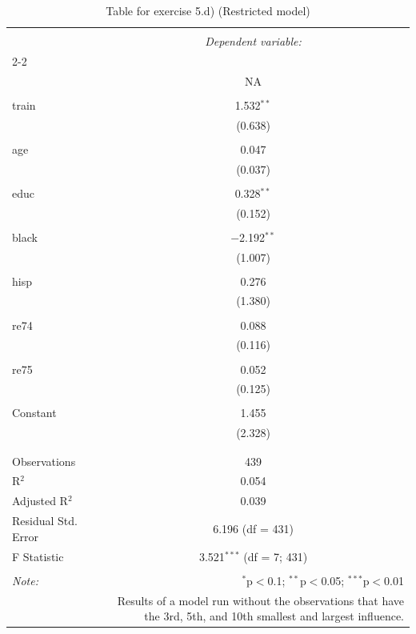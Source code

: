 
\begin{table}[!htbp] \centering 
  \caption{Table for exercise 5.d) (Restricted model)} 
  \label{} 
\begin{tabular}{@{\extracolsep{5pt}}lc} 
\\[-1.8ex]\hline 
\hline \\[-1.8ex] 
 & \multicolumn{1}{c}{\textit{Dependent variable:}} \\ 
\cline{2-2} 
\\[-1.8ex] & NA \\ 
\hline \\[-1.8ex] 
 train & 1.532$^{**}$ \\ 
  & (0.638) \\ 
  & \\ 
 age & 0.047 \\ 
  & (0.037) \\ 
  & \\ 
 educ & 0.328$^{**}$ \\ 
  & (0.152) \\ 
  & \\ 
 black & $-$2.192$^{**}$ \\ 
  & (1.007) \\ 
  & \\ 
 hisp & 0.276 \\ 
  & (1.380) \\ 
  & \\ 
 re74 & 0.088 \\ 
  & (0.116) \\ 
  & \\ 
 re75 & 0.052 \\ 
  & (0.125) \\ 
  & \\ 
 Constant & 1.455 \\ 
  & (2.328) \\ 
  & \\ 
\hline \\[-1.8ex] 
Observations & 439 \\ 
R$^{2}$ & 0.054 \\ 
Adjusted R$^{2}$ & 0.039 \\ 
Residual Std. Error & 6.196 (df = 431) \\ 
F Statistic & 3.521$^{***}$ (df = 7; 431) \\ 
\hline 
\hline \\[-1.8ex] 
\textit{Note:}  & \multicolumn{1}{r}{$^{*}$p$<$0.1; $^{**}$p$<$0.05; $^{***}$p$<$0.01} \\ 
 & \multicolumn{1}{r}{\parbox{7cm}{Results of a model run without the observations that have the 3rd, 5th, and 10th smallest and largest influence.}} \\ 
\end{tabular} 
\end{table} 

